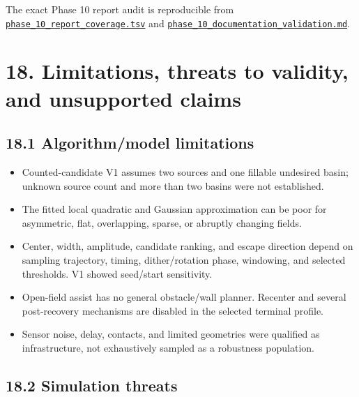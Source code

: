 \documentclass[
  10pt,
  letterpaper,
]{article}
\providecommand{\tightlist}{%
  \setlength{\itemsep}{0pt}\setlength{\parskip}{0pt}}
\begin{document}
The exact Phase 10 report audit is reproducible from
\href{validation/phase_10_report_coverage.tsv}{\nolinkurl{phase\_10\_report\_coverage.tsv}} and
\href{validation/phase_10_documentation_validation.md}{\nolinkurl{phase\_10\_documentation\_validation.md}}.

\section{18. Limitations, threats to validity, and unsupported claims}\label{limitations-threats-to-validity-and-unsupported-claims}

\subsection{18.1 Algorithm/model limitations}\label{algorithmmodel-limitations}

\begin{itemize}
\tightlist
\item
  Counted-candidate V1 assumes two sources and one fillable undesired basin;
  unknown source count and more than two basins were not established.
\item
  The fitted local quadratic and Gaussian approximation can be poor for
  asymmetric, flat, overlapping, sparse, or abruptly changing fields.
\item
  Center, width, amplitude, candidate ranking, and escape direction depend on
  sampling trajectory, timing, dither/rotation phase, windowing, and selected
  thresholds. V1 showed seed/start sensitivity.
\item
  Open-field assist has no general obstacle/wall planner. Recenter and several
  post-recovery mechanisms are disabled in the selected terminal profile.
\item
  Sensor noise, delay, contacts, and limited geometries were qualified as
  infrastructure, not exhaustively sampled as a robustness population.
\end{itemize}

\subsection{18.2 Simulation threats}\label{simulation-threats}
\end{document}
